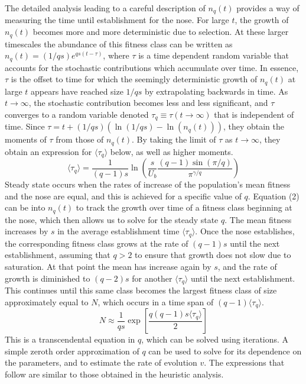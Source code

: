 \documentclass[12pt, one column]{article}
\begin{document}
The detailed analysis leading to a careful description of $n_q(t)$ provides a way of measuring the time until establishment for the nose.  For large $t$, the growth of $n_q(t)$ becomes more and more deterministic due to selection.  At these larger timescales the abundance of this fitness class can be written as $n_q(t) = (1/qs) e^{qs(t-\tau)}$, where $\tau$ is a time dependent random variable that accounts for the stochastic contributions which accumulate over time.  In essence, $\tau$ is the offset to time for which the seemingly deterministic growth of $n_q(t)$ at large $t$ appears have reached size $1/qs$ by extrapolating backwards in time.  As $t\rightarrow \infty$, the stochastic contribution becomes less and less significant, and $\tau$ converges to a random variable denoted $\tau_q \equiv \tau (t\rightarrow \infty)$ that is independent of time.  Since $\tau = t +(1/qs)(\ln(1/qs)-\ln(n_q(t)))$, they obtain the moments of $\tau$ from those of $n_q(t)$.  By taking the limit of $\tau$ as $t\rightarrow \infty$, they obtain an expression for $\langle \tau_q \rangle$ below, as well as higher moments. 
\begin{equation} 
\langle \tau_q \rangle = \frac{1}{(q-1)s}\ln\left(\frac{s}{U_b}\frac{(q-1)\sin(\pi/q)}{\pi^{\gamma/q}}\right)
\end{equation}
Steady state occurs when the rates of increase of the population's mean fitness and the nose are equal, and this is achieved for a specific value of $q$.  Equation (2) can be into $n_q(t)$ to track the growth over time of a fitness class beginning at the nose, which then allows us to solve for the steady state $q$.  The mean fitness increases by $s$ in the average establishment time $\langle \tau_q \rangle$.  Once the nose establishes, the corresponding fitness class grows at the rate of $(q-1)s$ until the next establishment, assuming that $q>2$ to ensure that growth does not slow due to saturation.  At that point the mean has increase again by $s$, and the rate of growth is diminished to $(q-2)s$ for another $\langle \tau_q \rangle$ until the next establishment.  This continues until this same class becomes the largest fitness class of size approximately equal to $N$, which occurs in a time span of $(q-1) \langle \tau_q \rangle$.
\begin{equation}
N \approx  \frac{1}{qs} \exp\left[ \frac{q(q-1)s \langle \tau_q \rangle}{2}\right]  
\end{equation}
This is a transcendental equation in $q$, which can be solved using iterations.  A simple zeroth order approximation of $q$ can be used to solve for its dependence on the parameters, and to estimate the rate of evolution $v$. The expressions that follow are similar to those obtained in the heuristic analysis.
\end{document}
